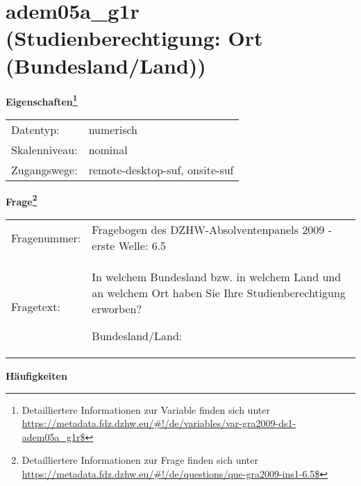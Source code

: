 
    \setcounter{footnote}{0}

    \vspace*{-1.8cm}
	\section{adem05a\_g1r (Studienberechtigung: Ort (Bundesland/Land))}
	\label{section:adem05a_g1r}



    \vspace*{0.5cm}
    \noindent\textbf{Eigenschaften\footnote{Detailliertere Informationen zur Variable finden sich unter
		\url{https://metadata.fdz.dzhw.eu/\#!/de/variables/var-gra2009-ds1-adem05a_g1r$}}}\\
	\begin{tabularx}{\hsize}{@{}lX}
	Datentyp: & numerisch \\
	Skalenniveau: & nominal \\
	Zugangswege: &
	  remote-desktop-suf, 
	  onsite-suf
 \\
    \end{tabularx}



				\vspace*{0.5cm}
                \noindent\textbf{Frage\footnote{Detailliertere Informationen zur Frage finden sich unter
		              \url{https://metadata.fdz.dzhw.eu/\#!/de/questions/que-gra2009-ins1-6.5$}}}\\
				\begin{tabularx}{\hsize}{@{}lX}
					Fragenummer: &
					  Fragebogen des DZHW-Absolventenpanels 2009 - erste Welle:
					  6.5
 \\
					Fragetext: & In welchem Bundesland bzw. in welchem Land und an welchem Ort haben Sie Ihre Studienberechtigung erworben?\par  Bundesland/Land: \\
				\end{tabularx}





        		\vspace*{0.5cm}
                \noindent\textbf{Häufigkeiten}

